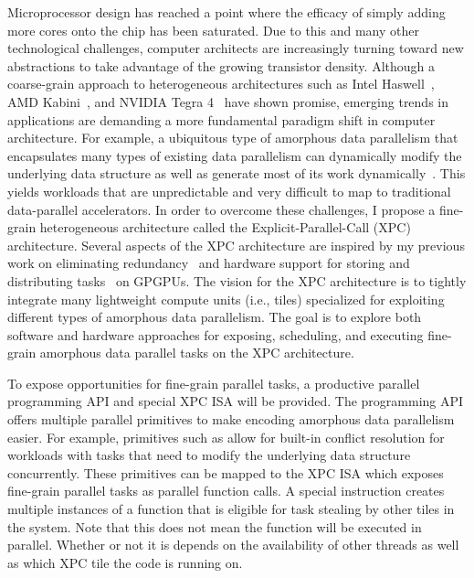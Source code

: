 Microprocessor design has reached a point where the efficacy of simply
adding more cores onto the chip has been saturated. Due to this and many
other technological challenges, computer architects are increasingly
turning toward new abstractions to take advantage of the growing
transistor density. Although a coarse-grain approach to heterogeneous
architectures such as Intel
Haswell~\cite{hammarlund-intel-haswell-ieeemicro2014}, AMD
Kabini~\cite{bouvier-amd-kabini-ieeemicro2014}, and NVIDIA Tegra
4~\cite{krewell-nvidia-tegra4-mpr2013} have shown promise, emerging
trends in applications are demanding a more fundamental paradigm shift in
computer architecture. For example, a ubiquitous type of amorphous data
parallelism that encapsulates many types of existing data parallelism can
dynamically modify the underlying data structure as well as generate most
of its work dynamically~\cite{pingali-tao-pldi2011}. This yields
workloads that are unpredictable and very difficult to map to traditional
data-parallel accelerators. In order to overcome these challenges, I
propose a fine-grain heterogeneous architecture called the
Explicit-Parallel-Call (XPC) architecture. Several aspects of the XPC
architecture are inspired by my previous work on eliminating
redundancy~\cite{kim-simt-vstruct-isca2013} and hardware support for
storing and distributing tasks~\cite{kim-hwwl-micro2014} on GPGPUs. The
vision for the XPC architecture is to tightly integrate many lightweight
compute units (i.e., tiles) specialized for exploiting different types of
amorphous data parallelism. The goal is to explore both software and
hardware approaches for exposing, scheduling, and executing fine-grain
amorphous data parallel tasks on the XPC architecture.

To expose opportunities for fine-grain parallel tasks, a productive
parallel programming API and special XPC ISA will be provided. The
programming API offers multiple parallel primitives to make encoding
amorphous data parallelism easier. For example, primitives such
as  allow for built-in conflict resolution for
workloads with tasks that need to modify the underlying data
structure concurrently. These primitives can be mapped to the XPC ISA
which exposes fine-grain parallel tasks as parallel function calls. A
special  instruction creates multiple instances of a function
that is eligible for task stealing by other tiles in the system. Note
that this does not mean the function will be executed in
parallel. Whether or not it is depends on the availability of other
threads as well as which XPC tile the code is running on.

